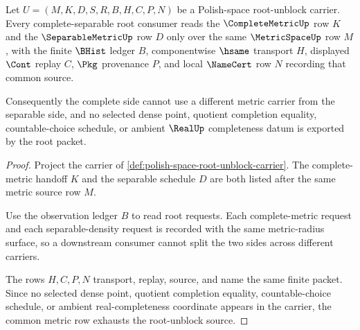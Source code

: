 \begin{theorem}
\label{thm:polish-space-root-unblock-common-metric}
Let $U=(M,K,D,S,R,B,H,C,P,N)$ be a Polish-space root-unblock carrier. Every complete-separable root consumer reads the $\CompleteMetricUp$ row $K$ and the $\SeparableMetricUp$ row $D$ only over the same $\MetricSpaceUp$ row $M$, with the finite $\BHist$ ledger $B$, componentwise $\hsame$ transport $H$, displayed $\Cont$ replay $C$, $\Pkg$ provenance $P$, and local $\NameCert$ row $N$ recording that common source.

Consequently the complete side cannot use a different metric carrier from the separable side, and no selected dense point, quotient completion equality, countable-choice schedule, or ambient $\RealUp$ completeness datum is exported by the root packet.
\end{theorem}
\begin{proof}
Project the carrier of \autoref{def:polish-space-root-unblock-carrier}. The complete-metric handoff $K$ and the separable schedule $D$ are both listed after the same metric source row $M$.

Use the observation ledger $B$ to read root requests. Each complete-metric request and each separable-density request is recorded with the same metric-radius surface, so a downstream consumer cannot split the two sides across different carriers.

The rows $H,C,P,N$ transport, replay, source, and name the same finite packet. Since no selected dense point, quotient completion equality, countable-choice schedule, or ambient real-completeness coordinate appears in the carrier, the common metric row exhausts the root-unblock source.
\end{proof}

